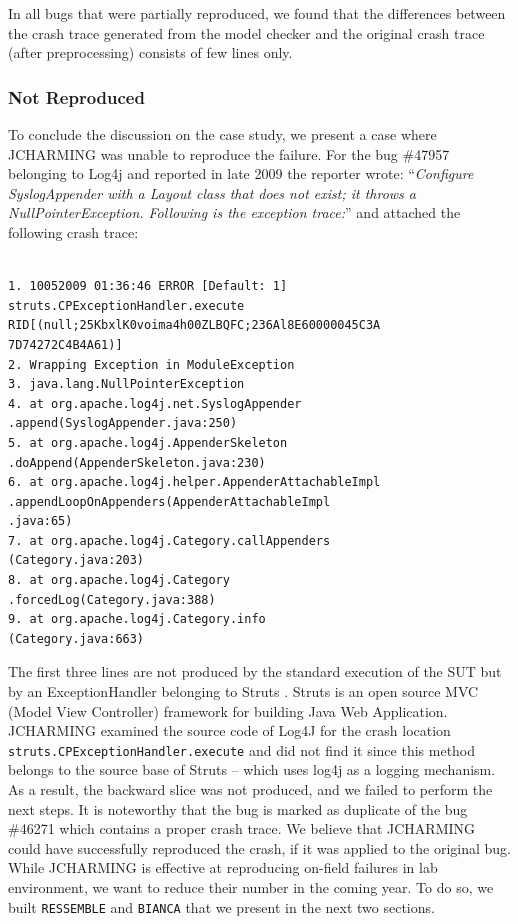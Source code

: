 In all bugs that were partially reproduced, we found that the
differences between the crash trace generated from the model
checker and the original crash trace (after preprocessing)
consists of few lines only.

\subsubsection{Not Reproduced}

To conclude the discussion on the case study, we present a
case where JCHARMING was unable to reproduce the failure.
For the bug \#47957 belonging to Log4j and reported in late
2009 the reporter wrote: ``{\it Configure SyslogAppender with a Layout class that does not
exist; it throws a NullPointerException. Following is the
exception trace:}'' and attached the following crash trace:

\begin{lstlisting}

1. 10052009 01:36:46 ERROR [Default: 1]
struts.CPExceptionHandler.execute
RID[(null;25KbxlK0voima4h00ZLBQFC;236Al8E60000045C3A
7D74272C4B4A61)]
2. Wrapping Exception in ModuleException
3. java.lang.NullPointerException
4. at org.apache.log4j.net.SyslogAppender
.append(SyslogAppender.java:250)
5. at org.apache.log4j.AppenderSkeleton
.doAppend(AppenderSkeleton.java:230)
6. at org.apache.log4j.helper.AppenderAttachableImpl
.appendLoopOnAppenders(AppenderAttachableImpl
.java:65)
7. at org.apache.log4j.Category.callAppenders
(Category.java:203)
8. at org.apache.log4j.Category
.forcedLog(Category.java:388)
9. at org.apache.log4j.Category.info
(Category.java:663)

\end{lstlisting}

The first three lines are not produced by the standard
execution of the SUT but by an ExceptionHandler belonging
to Struts \cite{ApacheSoftwareFoundation2000}. Struts is an open source MVC (Model View
Controller) framework for building Java Web Application.
JCHARMING examined the source code of Log4J for the
crash location {\tt struts.CPExceptionHandler.execute} and did not
find it since this method belongs to the source base of Struts
-- which uses log4j as a logging mechanism. As a result, the
backward slice was not produced, and we failed to perform the
next steps. It is noteworthy that the bug is marked as duplicate
of the bug \#46271 which contains a proper crash trace. We
believe that JCHARMING could have successfully
reproduced the crash, if it was applied to the original bug. \\

While JCHARMING is effective at reproducing on-field failures in lab environment, we want to reduce their number in the coming year. To do so, we built {\tt RESSEMBLE} and {\tt BIANCA} that we present in the next two sections.
